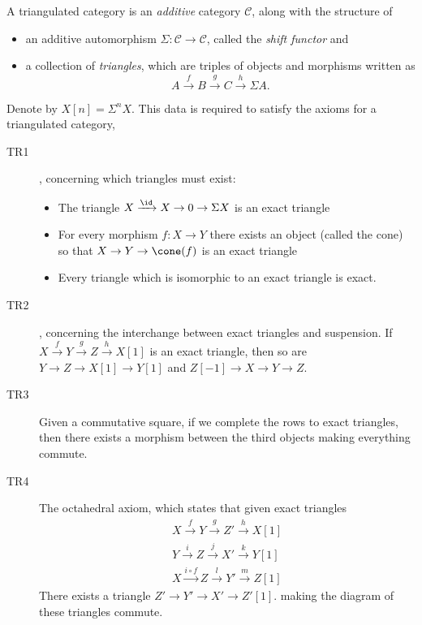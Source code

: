 
 
 
A triangulated category is an \emph{additive} category $\mathcal C$, along with the structure of 
\begin{itemize}
    \item an additive automorphism $\Sigma: \mathcal C\to \mathcal C$, called the \emph{shift functor} and
    \item a collection of \emph{triangles}, which are triples of objects and morphisms written as 
    \[A\xrightarrow{f} B \xrightarrow{g} C\xrightarrow{h} \Sigma A.\]
\end{itemize}
Denote by $X[n]=\Sigma^nX$.
This data is required to satisfy the axioms for a triangulated category,
\begin{description}
    \item[TR1], concerning which triangles must exist:
    \begin{itemize} 
        \item The triangle $X\xrightarrow{\id} X\to 0 \to \Sigma X$ is an exact triangle
        \item  For every morphism $f:X\to Y$ there exists an object (called the cone) so that $X\to Y \to \cone(f)$ is an exact triangle
        \item Every triangle which is isomorphic to an exact triangle is exact.
    \end{itemize}
    \item[TR2], concerning the interchange between exact triangles and suspension. If $X\xrightarrow{f} Y \xrightarrow{g} Z\xrightarrow{h} X[1]$ is an exact triangle, then so are $Y\to Z\to X[1]\to Y[1]$ and $Z[-1]\to X\to Y\to Z$.
    \item[TR3] Given a commutative square, if we complete the rows to exact triangles, then there exists a morphism between the third objects making everything commute.
    \item[TR4] The octahedral axiom, which states that given exact triangles
    \begin{align*}
        X\xrightarrow{f} Y \xrightarrow{g} Z'\xrightarrow{h} X[1]\\
        Y\xrightarrow{i} Z \xrightarrow{j} X'\xrightarrow{k} Y[1]\\
        X\xrightarrow{i\circ f} Z \xrightarrow{l} Y'\xrightarrow{m} Z[1]
    \end{align*}
    There exists a triangle $Z'\to Y'\to X'\to Z'[1]$.
    making the diagram of these triangles commute.
\end{description}
 


 